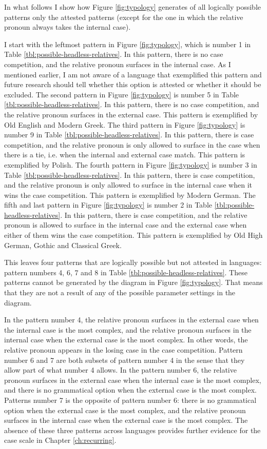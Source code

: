 In what follows I show how Figure \ref{fig:typology} generates of all logically possible patterns only the attested patterns (except for the one in which the relative pronoun always takes the internal case).

I start with the leftmost pattern in Figure \ref{fig:typology}, which is number 1 in Table \ref{tbl:possible-headless-relatives}. In this pattern, there is no case competition, and the relative pronoun surfaces in the internal case. As I mentioned earlier, I am not aware of a language that exemplified this pattern and future research should tell whether this option is attested or whether it should be excluded.
The second pattern in Figure \ref{fig:typology} is number 5 in Table \ref{tbl:possible-headless-relatives}. In this pattern, there is no case competition, and the relative pronoun surfaces in the external case. This pattern is exemplified by Old English and Modern Greek.
The third pattern in Figure \ref{fig:typology} is number 9 in Table \ref{tbl:possible-headless-relatives}. In this pattern, there is case competition, and the relative pronoun is only allowed to surface in the case when there is a tie, i.e. when the internal and external case match. This pattern is exemplified by Polish.
The fourth pattern in Figure \ref{fig:typology} is number 3 in Table \ref{tbl:possible-headless-relatives}. In this pattern, there is case competition, and the relative pronoun is only allowed to surface in the internal case when it wins the case competition. This pattern is exemplified by Modern German.
The fifth and last pattern in Figure \ref{fig:typology} is number 2 in Table \ref{tbl:possible-headless-relatives}. In this pattern, there is case competition, and the relative pronoun is allowed to surface in the internal case and the external case when either of them wins the case competition. This pattern is exemplified by Old High German, Gothic and Classical Greek.

This leaves four patterns that are logically possible but not attested in languages: pattern numbers 4, 6, 7 and 8 in Table \ref{tbl:possible-headless-relatives}. These patterns cannot be generated by the diagram in Figure \ref{fig:typology}. That means that they are not a result of any of the possible parameter settings in the diagram.

In the pattern number 4, the relative pronoun surfaces in the external case when the internal case is the most complex, and the relative pronoun surfaces in the internal case when the external case is the most complex. In other words, the relative pronoun  appears in the losing case in the case competition.
Pattern number 6 and 7 are both subsets of pattern number 4 in the sense that they allow part of what number 4 allows.
In the pattern number 6, the relative pronoun surfaces in the external case when the internal case is the most complex, and there is no grammatical option when the external case is the most complex.
Patterns number 7 is the opposite of pattern number 6: there is no grammatical option when the external case is the most complex, and the relative pronoun surfaces in the internal case when the external case is the most complex.
The absence of these three patterns across languages provides further evidence for the case scale in Chapter \ref{ch:recurring}.

